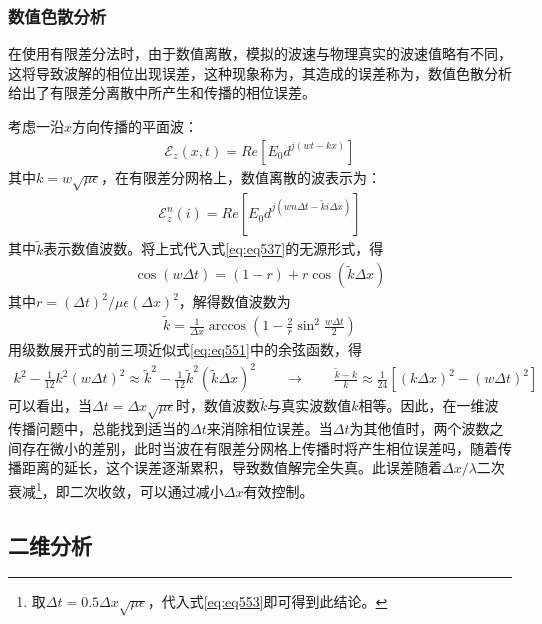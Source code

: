 \documentclass{article}
\numberwithin{equation}{section}
\begin{document}
\subsubsection{数值色散分析}
在使用有限差分法时，由于数值离散，模拟的波速与物理真实的波速值略有不同，这将导致波解的相位出现误差，这种现象称为\textbf{\color{blue}{数值色散}}，其造成的误差称为\textbf{\color{blue}{数值相位误差}}，数值色散分析给出了有限差分离散中所产生和传播的相位误差。\par
考虑一沿$x$方向传播的平面波：
\begin{align}
    \label{eq:eq549}
    \mathcal{E}_z(x,t)=Re\left[E_0d^{j(wt-kx)}\right]
\end{align}
其中$k=w\sqrt{\mu\epsilon}$，在有限差分网格上，数值离散的波表示为：
\begin{align}
    \label{eq:eq550}
    \mathcal{E}_z^n(i)=Re\left[E_0d^{j(wn\Delta t-\tilde{k}i\Delta x)}\right]
\end{align}
其中$\tilde{k}$表示数值波数。将上式代入式\ref{eq:eq537}的无源形式，得
\begin{align}
    \label{eq:eq551}
    \cos(w\Delta t)=(1-r)+r\cos(\tilde{k}\Delta x)
\end{align}
其中$r=(\Delta t)^2/\mu\epsilon(\Delta x)^2$，解得数值波数为
\begin{align}
    \label{eq:eq552}
    \tilde{k}=\frac{1}{\Delta x}\arccos\left(1-\frac{2}{r}\sin^2\frac{w\Delta t}{2}\right)
\end{align}
用级数展开式的前三项近似式\ref{eq:eq551}中的余弦函数，得
\begin{align}
    \label{eq:eq553}
    k^2-\frac{1}{12}k^2(w\Delta t)^2\approx\tilde{k}^2-\frac{1}{12}\tilde{k}^2(\tilde{k}\Delta x)^2\qquad\longrightarrow\qquad \frac{\tilde{k}-k}{k}\approx\frac{1}{24}\left[(k\Delta x)^2-(w\Delta t)^2\right]
\end{align}
可以看出，当$\Delta t=\Delta x\sqrt{\mu\epsilon}$时，数值波数$\tilde{k}$与真实波数值$k$相等。因此，在一维波传播问题中，总能找到适当的$\Delta t$来消除相位误差。当$\Delta t$为其他值时，两个波数之间存在微小的差别，此时当波在有限差分网格上传播时将产生相位误差吗，随着传播距离的延长，这个误差逐渐累积，导致数值解完全失真。此误差随着$\Delta x/\lambda$二次衰减\footnote{取$\Delta t=0.5\Delta x\sqrt{\mu\epsilon}$，代入式\ref{eq:eq553}即可得到此结论。}，即二次收敛，可以通过减小$\Delta x$有效控制。
\subsection{二维分析}
\end{document}
